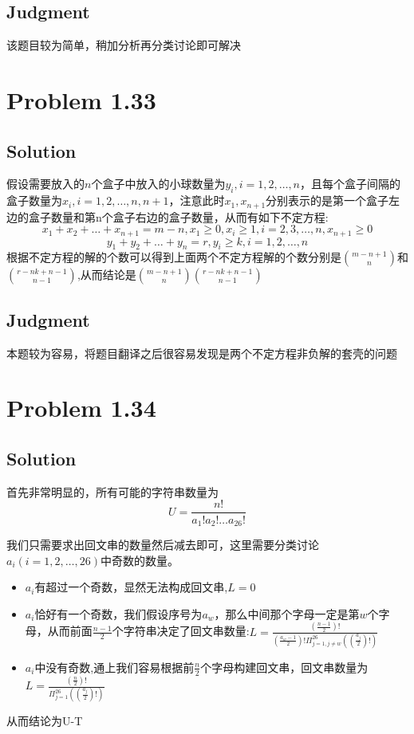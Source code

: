 \documentclass[a4paper]{ctexart}
\begin{document}
\subsection{Judgment}
该题目较为简单，稍加分析再分类讨论即可解决
\section{Problem 1.33}
\subsection{Solution}
假设需要放入的$n$个盒子中放入的小球数量为$y_i,i=1,2,\dots,n$，且每个盒子间隔的盒子数量为$x_i,i=1,2,\dots,n,n+1$，注意此时$x_1,x_{n+1}$分别表示的是第一个盒子左边的盒子数量和第n个盒子右边的盒子数量，从而有如下不定方程:
\begin{equation}
    x_1 + x_2 + \dots + x_{n+1} = m-n, x_1\geq 0, x_i \geq 1,i = 2,3,\dots, n, x_{n+1} \geq 0
\end{equation}
\begin{equation}
    y_1 + y_2 + \dots + y_n = r, y_i\geq k, i = 1,2,\dots, n
\end{equation}
根据不定方程的解的个数可以得到上面两个不定方程解的个数分别是$\binom{m-n+1}{n}$和$\binom{r-nk+n-1}{n-1}$,从而结论是$\binom{m-n+1}{n}\binom{r-nk+n-1}{n-1}$
\subsection{Judgment}
本题较为容易，将题目翻译之后很容易发现是两个不定方程非负解的套壳的问题
\section{Problem 1.34}
\subsection{Solution}
首先非常明显的，所有可能的字符串数量为
\begin{equation}
    U = \frac{n!}{a_1!a_2!\dots a_{26}!}
\end{equation}
\par
我们只需要求出回文串的数量然后减去即可，这里需要分类讨论$a_i(i=1,2,\dots,26)$中奇数的数量。
\begin{itemize}
    \item $a_i$有超过一个奇数，显然无法构成回文串,$L=0$
    \item $a_i$恰好有一个奇数，我们假设序号为$a_w$，那么中间那个字母一定是第$w$个字母，从而前面$\frac{n-1}{2}$个字符串决定了回文串数量:$L=\frac{(\frac{n-1}{2})!}{(\frac{a_w-1}{2})!{\Pi_{j=1,j\neq w}^{26}((\frac{a_j}{2})!)}}$
    \item $a_i$中没有奇数,通上我们容易根据前$\frac{n}{2}$个字母构建回文串，回文串数量为$L=\frac{(\frac{n}{2})!}{{\Pi_{j=1}^{26}((\frac{a_j}{2})!)}}$
\end{itemize}
从而结论为U-T
\end{document}
